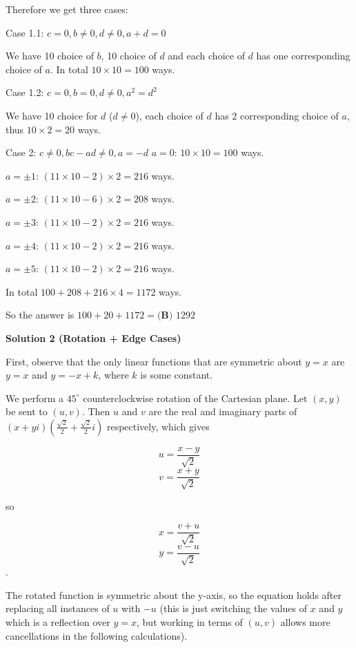 \begin{enumerate}
 Therefore we get three cases:

 Case 1.1: $c= 0, b\neq 0, d\neq 0, a+d=0$

 We have 10 choice of $b$, 10 choice of $d$ and each choice of $d$ has one corresponding choice of $a$. In total $10\times 10=100$ ways.

 


 Case 1.2: $c= 0, b = 0, d\neq 0, a^2=d^2$

 We have 10 choice for $d$ ($d\neq 0$), each choice of $d$ has 2 corresponding choice of $a$, thus $10\times 2=20$ ways.

 


 Case 2: $c\neq 0, bc-ad\neq 0, a=-d$
$a=0$: $10\times 10=100$ ways.

 $a=\pm 1$: $(11\times 10-2)\times 2=216$ ways.

 $a=\pm 2$: $(11\times 10-6)\times 2=208$ ways.

 $a=\pm 3$: $(11\times 10-2)\times 2=216$ ways.

 $a=\pm 4$: $(11\times 10-2)\times 2=216$ ways.

 $a=\pm 5$: $(11\times 10-2)\times 2=216$ ways.

 In total $100+208+216\times 4= 1172$ ways.

 


 So the answer is $100+20+1172= \boxed{\textbf{(B) }1292}$




\textbf{Solution 2 (Rotation + Edge Cases)}

First, observe that the only linear functions that are symmetric about $y = x$ are $y = x$ and $y = -x+k$, where $k$ is some constant. 

 


 We perform a $45^\circ$ counterclockwise rotation of the Cartesian plane. Let $(x, y)$ be sent to $(u, v)$. Then $u$ and $v$ are the real and imaginary parts of $(x + yi)(\frac{\sqrt{2}}{2}+\frac{\sqrt{2}}{2}i)$ respectively, which gives

 
 \[u = \frac{x - y}{\sqrt{2}}\]
 \[v = \frac{x + y}{\sqrt{2}}\]

 so

 
 \[x = \frac{v + u}{\sqrt{2}}\]
 \[y = \frac{v - u}{\sqrt{2}}\].

 The rotated function is symmetric about the y-axis, so the equation holds after replacing all instances of $u$ with $-u$ (this is just switching the values of $x$ and $y$ which is a reflection over $y = x$, but working in terms of $(u, v)$ allows more cancellations in the following calculations).


\end{enumerate}
